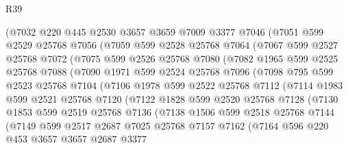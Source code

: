 \begin{lexlean}{R39}
\begin{coremodule}
      (@7032
        @220
        @445
        @2530
        @3657
        @3659
        @7009
        @3377
        @7046
        (@7051
          @599
          @2529
          @25768
          @7056
          (@7059
            @599
            @2528
            @25768
            @7064
            (@7067
              @599
              @2527
              @25768
              @7072
              (@7075
                @599
                @2526
                @25768
                @7080
                (@7082
                  @1965
                  @599
                  @2525
                  @25768
                  @7088
                  (@7090
                    @1971
                    @599
                    @2524
                    @25768
                    @7096
                    (@7098
                      @795
                      @599
                      @2523
                      @25768
                      @7104
                      (@7106
                        @1978
                        @599
                        @2522
                        @25768
                        @7112
                        (@7114
                          @1983
                          @599
                          @2521
                          @25768
                          @7120
                          (@7122
                            @1828
                            @599
                            @2520
                            @25768
                            @7128
                            (@7130
                              @1853
                              @599
                              @2519
                              @25768
                              @7136
                              (@7138
                                @1506
                                @599
                                @2518
                                @25768
                                @7144
                                (@7149
                                  @599
                                  @2517
                                  @2687
                                  @7025
                                  @25768
                                  @7157
                                  @7162
                                  (@7164
                                    @596
                                    @220
                                    @453
                                    @3657
                                    @3657
                                    @2687
                                    @3377

\end{coremodule}
\end{lexlean}

